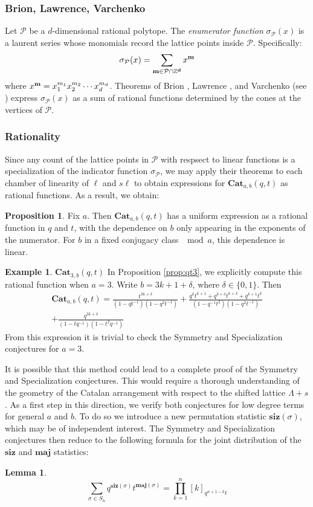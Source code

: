 \documentclass{amsart}[12pt]
\theoremstyle{definition}
\newtheorem{lemma}[dummy]{Lemma}
\newtheorem{example}[dummy]{Example}
\newtheorem{proposition}[dummy]{Proposition}
\newcommand{\Z}{\mathbb{Z}}
\newcommand{\Cat}{\mathbf{Cat}}
\newcommand{\sk}{s\ell}
\newcommand{\maj}{\mathbf{maj}}
\newcommand{\siz}{\mathbf{siz}}
\begin{document}
\subsubsection{Brion, Lawrence, Varchenko}
Let $\mathcal{P}$ be a $d$-dimensional rational polytope. The \emph{enumerator function} $\sigma_{\mathcal{P}}(x)$ is a laurent series whose monomials record the lattice points inside $\mathcal{P}$. Specifically:
$$\sigma_{\mathcal{P}}(x)=\sum_{\bf{m}\in \mathcal{P}\cap \Z^d}x^{\bf{m}}$$
where $x^{\bf{m}}=x_1^{m_1}x_2^{m_2}\cdots x_d^{m_d}$.
Theorems of Brion \cite{Brion}, Lawrence \cite{Lawrence}, and Varchenko \cite{Varchenko} (see \cite{BHS}) express $\sigma_{\mathcal{P}}(x)$ as a sum of rational functions determined by the cones at the vertices of $\mathcal{P}$.
\subsubsection{Rationality}
Since any count of the lattice points in $\mathcal{P}$ with respsect to linear functions is a specialization of the indicator function $\sigma_{\mathcal{P}}$, we may apply their theorems to each chamber of linearity of $\ell$ and $\sk$ to obtain expressions for $\Cat_{a,b}(q,t)$ as rational functions. As a result, we obtain:
\begin{proposition}
Fix $a$. Then $\Cat_{a,b}(q,t)$ has a uniform expression as a rational function in $q$ and $t$, with the dependence on $b$ only appearing in the exponents of the numerator. For $b$ in a fixed conjugacy class $\mod a$, this dependence is linear.
\end{proposition}
\begin{example}{$\Cat_{3,b}(q,t)$}
In Proposition \ref{prop:qt3}, we explicitly compute this rational function when $a=3$. Write $b=3k+1+\delta$, where $\delta\in\{0,1\}$. Then
\begin{multline*}
\Cat_{a,b}(q,t)=\frac{t^{3k+\delta}}{(1-qt^{-1})(1-q^2t^{-1})} +\frac{q^kt^{k+1}+q^{k+\delta}t^{k+\delta}+q^{k+1}t^k}{(1-q^{-1}t^2)(1-q^2t^{-1})} \\+\frac{q^{3k+\delta}}{(1-tq^{-1})(1-t^2q^{-1})}
\end{multline*}
From this expression it is trivial to check the Symmetry and Specialization conjectures for $a=3$.
\end{example}
It is possible that this method could lead to a complete proof of the Symmetry and Specialization conjectures. This would require a thorough understanding of the geometry of the Catalan arrangement with respect to the shifted lattice $\Lambda+s$.
As a first step in this direction, we verify both conjectures for low degree terms for general $a$ and $b$. To do so we introduce a new permutation statistic $\siz(\sigma)$, which may be of independent interest. The Symmetry and Specialization conjectures then reduce to the following formula for the joint distribution of the $\siz$ and $\maj$ statistics:
\begin{lemma}
$$\sum_{\sigma\in S_n} q^{\siz(\sigma)}t^{\maj(\sigma)}=\prod_{k=1}^n [k]_{q^{n+1-k}t}$$
\end{lemma}
\end{document}
